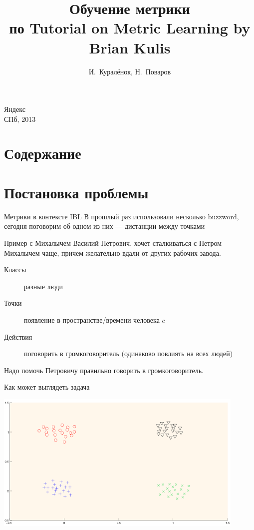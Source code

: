\documentclass[14pt, fleqn, xcolor={dvipsnames, table}]{beamer}
\title{Обучение метрики\\\small{по Tutorial on Metric Learning by Brian Kulis}}
\author[]{\small{%
И.~Куралёнок,
Н.~Поваров}}
\date{}
\begin{document}
\begin{frame}
\maketitle
\small
\begin{center}
\vspace{-60pt}
\normalsize {\color{red}Я}ндекс \\
\vspace{80pt}
\footnotesize СПб, 2013
\end{center}
\end{frame}

\section{Содержание}
\section{Постановка проблемы}
\begin{frame}{Метрики в контексте IBL}
В прошлый раз использовали несколько buzzword, сегодня поговорим об одном из них --- дистанции между точками
\end{frame}

\begin{frame}{Пример с Михалычем}
Василий Петрович, хочет сталкиваться с Петром Михалычем чаще, причем желательно вдали от других рабочих завода.
\begin{description}
\item[Классы] разные люди
\item[Точки] появление в пространстве/времени человека $c$
\item[Действия] поговорить в громкоговоритель (одинаково повлиять на всех людей)
\end{description}
Надо помочь Петровичу правильно говорить в громкоговоритель.
\end{frame}

\begin{frame}{Как может выглядеть задача}
\begin{center}
\includegraphics[width=0.9\textwidth]{linsep-setup.png}
\end{center}
\end{frame}
\end{document}
